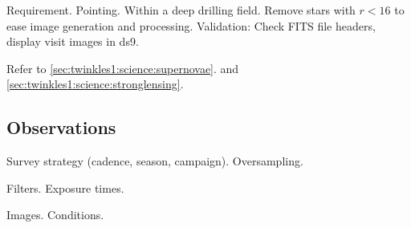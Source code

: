 Requirement. Pointing. 
Within a deep drilling field. Remove stars with $r < 16$ to ease image generation and processing.
Validation: Check FITS file headers, display visit images in ds9.  

Refer to \autoref{sec:twinkles1:science:supernovae}.
and \autoref{sec:twinkles1:science:stronglensing}.




\subsection{Observations}

Survey strategy (cadence, season, campaign). Oversampling.

Filters. Exposure times.

Images. Conditions.


